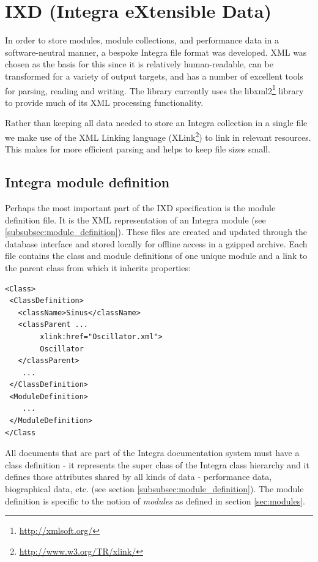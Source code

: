 \documentclass{article}
\begin{document}
\section{IXD (Integra eXtensible Data)}\label{sec:ixd}

In order to store modules, module collections, and performance data in a software-neutral manner, a bespoke Integra file format was developed. XML was chosen as the basis for this since it is relatively human-readable, can be transformed for a variety of output targets, and has a number of excellent tools for parsing, reading and writing. The library currently uses the libxml2\footnote{\url{http://xmlsoft.org/}} library to provide much of its XML processing functionality.

Rather than keeping all data needed to store an Integra collection in a single file we make use of the XML Linking language (XLink\footnote{\url{http://www.w3.org/TR/xlink/}}) to link in relevant resources. This makes for more efficient parsing and helps to keep file sizes small.

\subsection{Integra module definition}\label{subsect:integra_class_definition}

Perhaps the most important part of the IXD specification is the module definition file. It is the XML representation of an Integra module (see \ref{subsubsec:module_definition}). These files are created and updated through the database interface and stored locally for offline access in a gzipped archive. Each file contains the class and module definitions of one unique module and a link to the parent class from which it inherits properties:

{\small
\begin{verbatim}
<Class>
 <ClassDefinition>
   <className>Sinus</className>
   <classParent ...
        xlink:href="Oscillator.xml">
        Oscillator
   </classParent>
    ...
 </ClassDefinition>
 <ModuleDefinition>
    ...
 </ModuleDefinition>
</Class
\end{verbatim}
}
All documents that are part of the Integra documentation system must have a class definition - it represents the super class of the Integra class hierarchy and it defines those attributes shared by all kinds of data - performance data, biographical data, etc. (see section \ref{subsubsec:module_definition}). The module definition is specific to the notion of \emph{modules} as defined in section \ref{sec:modules}.
\end{document}
